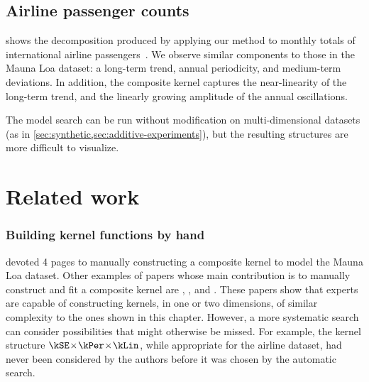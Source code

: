 \subsection{Airline passenger counts}

 shows the decomposition produced by applying our method to monthly totals of international airline passengers~\citep{box2013time}.
We observe similar components to those in the Mauna Loa dataset: a long-term trend, annual periodicity, and medium-term deviations.
In addition, the composite kernel captures the near-linearity of the long-term trend, and the linearly growing amplitude of the annual oscillations.



The model search can be run without modification on multi-dimensional datasets (as in \cref{sec:synthetic,sec:additive-experiments}), but the resulting structures are more difficult to visualize.


\section{Related work}
\label{sec:gpss-related-work}

\def\rwsheader{\subsubsection}

\rwsheader{Building kernel functions by hand}
\citet[chapter 5]{rasmussen38gaussian} devoted 4 pages to manually constructing a composite kernel to model the Mauna Loa dataset.
Other examples of papers whose main contribution is to manually construct and fit a composite \gp{} kernel are \citet{textperiodic13}, \citet{lloydgefcom2012}, and \citet{EdgarTelescope}.
These papers show that experts are capable of constructing kernels, in one or two dimensions, of similar complexity to the ones shown in this chapter.
However, a more systematic search can consider possibilities that might otherwise be missed.
For example, the kernel structure $\kSE \kerntimes \kPer \kerntimes \kLin$, while appropriate for the airline dataset, had never been considered by the authors before it was chosen by the automatic search.



